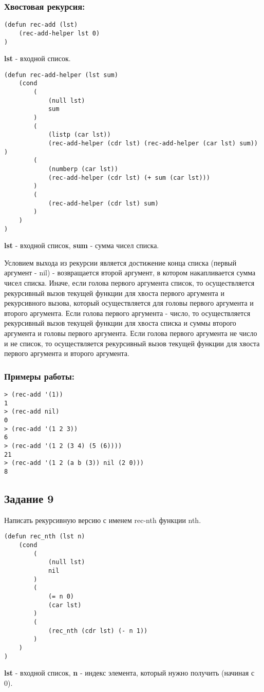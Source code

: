 \documentclass[a4paper,12pt]{article}
\begin{document}
\subsubsection*{Хвостовая рекурсия:}
\begin{lstlisting}[caption=Функция-обертка для вычисления суммы чисел списка]
(defun rec-add (lst)
	(rec-add-helper lst 0)
)
\end{lstlisting}
\textbf{lst} - входной список.
\begin{lstlisting}[caption=Функция вычисления суммы чисел списка]
(defun rec-add-helper (lst sum)
	(cond	
		(
			(null lst) 
			sum
		)
		(
			(listp (car lst)) 
			(rec-add-helper (cdr lst) (rec-add-helper (car lst) sum)) )
		(
			(numberp (car lst)) 
			(rec-add-helper	(cdr lst) (+ sum (car lst)))
		)
		(
			(rec-add-helper (cdr lst) sum)
		)
	)
)
\end{lstlisting}
\textbf{lst} - входной список, \textbf{sum} - сумма чисел списка.

Условием выхода из рекурсии является достижение конца списка (первый аргумент - nil) - возвращается второй аргумент, в котором накапливается сумма чисел списка. Иначе, если голова первого аргумента список, то осуществляется рекурсивный вызов текущей функции для хвоста первого аргумента и рекурсивного вызова, который осуществляется для головы первого аргумента и второго аргумента. Если голова первого аргумента - число, то осуществляется рекурсивный вызов текущей функции для хвоста списка и суммы второго аргумента и головы первого аргумента. Если голова первого аргумента не число и не список, то осуществляется рекурсивный вызов текущей функции для хвоста первого аргумента и второго аргумента.
\subsubsection*{Примеры работы:}
\begin{lstlisting}
> (rec-add '(1))
1
> (rec-add nil)
0
> (rec-add '(1 2 3))
6
> (rec-add '(1 2 (3 4) (5 (6))))
21
> (rec-add '(1 2 (a b (3)) nil (2 0)))
8
\end{lstlisting}

\subsection*{Задание 9}

Написать рекурсивную версию с именем rec-nth функции nth.
\begin{lstlisting}[caption=Рекурсивная версия функции nth]
(defun rec_nth (lst n)
	(cond 
		( 
			(null lst) 
			nil
		)
		(
			(= n 0)
			(car lst)
		)
		(
			(rec_nth (cdr lst) (- n 1))
		)
	)
)
\end{lstlisting}
\textbf{lst} - входной список, \textbf{n} - индекс элемента, который нужно получить (начиная с 0).
\end{document}
